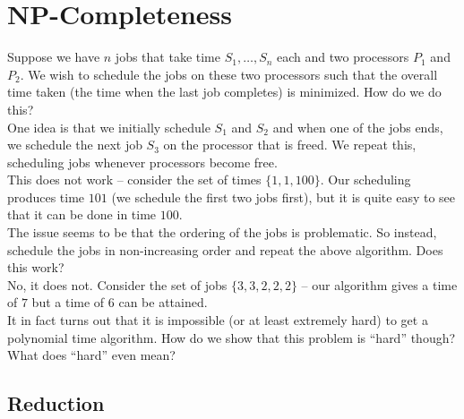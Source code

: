 \section{NP-Completeness}

Suppose we have $n$ jobs that take time $S_1,\ldots,S_n$ each and two processors $P_1$ and $P_2$. We wish to schedule the jobs on these two processors such that the overall time taken (the time when the last job completes) is minimized. How do we do this?\\

One idea is that we initially schedule $S_1$ and $S_2$ and when one of the jobs ends, we schedule the next job $S_3$ on the processor that is freed. We repeat this, scheduling jobs whenever processors become free.\\
This does not work -- consider the set of times $\{1,1,100\}$. Our scheduling produces time $101$ (we schedule the first two jobs first), but it is quite easy to see that it can be done in time $100$.\\

The issue seems to be that the ordering of the jobs is problematic. So instead, schedule the jobs in non-increasing order and repeat the above algorithm. Does this work?\\
No, it does not. Consider the set of jobs $\{3,3,2,2,2\}$ -- our algorithm gives a time of $7$ but a time of $6$ can be attained.\\

It in fact turns out that it is impossible (or at least extremely hard) to get a polynomial time algorithm. How do we show that this problem is ``hard'' though? What does ``hard'' even mean?\\

\subsection{Reduction}

